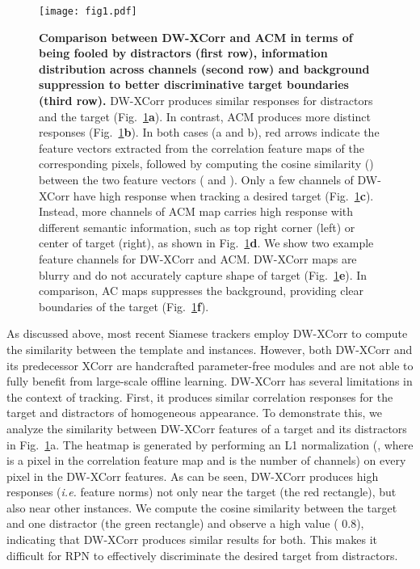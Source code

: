 \documentclass[10pt,twocolumn,letterpaper,final]{cvpr}
\begin{document}
\begin{figure}
  \centering
  \texttt{[image: fig1.pdf]}
\caption{
  \textbf{Comparison between DW-XCorr and ACM in terms of being fooled by distractors (first row), information distribution across channels (second row) and background suppression to better discriminative target boundaries (third row).}
   DW-XCorr produces similar responses for distractors and the target  (Fig.~\ref{Fig:1}\textbf{a}). In contrast, ACM produces more distinct responses (Fig.~\ref{Fig:1}\textbf{b}). In both cases (a and b), red arrows indicate the feature vectors extracted from the correlation feature maps of the corresponding pixels, followed by computing the cosine similarity () between the two feature vectors ( and ). Only a few channels of DW-XCorr have high response when tracking a desired target (Fig.~\ref{Fig:1}\textbf{c}). Instead, more channels of ACM map carries high response with different semantic information, such as top right corner (left) or center of target (right), as shown in Fig.~\ref{Fig:1}\textbf{d}. We show two example feature channels for DW-XCorr and ACM. DW-XCorr maps are blurry and do not accurately capture shape of target (Fig.~\ref{Fig:1}\textbf{e}). In comparison, AC maps suppresses the background, providing clear boundaries of the target (Fig.~\ref{Fig:1}\textbf{f}).
  }\label{Fig:1}
\end{figure}



As discussed above, most recent Siamese trackers employ DW-XCorr to compute the similarity between the template and instances. However, both DW-XCorr and its predecessor XCorr are handcrafted parameter-free modules and are not able to fully benefit from large-scale offline learning. DW-XCorr has several limitations in the context of tracking. First, it produces similar correlation responses for the target and distractors of homogeneous appearance. To demonstrate this, we analyze the similarity between  DW-XCorr features of a target and its distractors in Fig.~\ref{Fig:1}a. The heatmap is generated by performing an L1 normalization (, where  is a pixel in the correlation feature map and  is the number of channels) on every pixel in the DW-XCorr features.
As can be seen, DW-XCorr produces high responses (\textit{i.e.} feature norms) not only near the target (the red rectangle), but also near other instances. We compute the cosine similarity between the target and one distractor (the green rectangle) and observe a high value (  0.8), indicating that DW-XCorr produces similar results for both. This makes it difficult for RPN to effectively discriminate the desired target from distractors.
\end{document}
